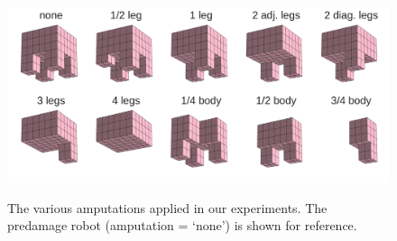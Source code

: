 \begin{figure}[h]
\begin{center}
\includegraphics[trim={14pt 0 14pt 0},clip,width=0.7\linewidth]{Chapter05/fig/damage_scenarios.png}\\
\caption{\label{fig:scenarios}The various amputations applied in our experiments. 
The predamage robot (amputation = `none') is shown for reference.}
\vspace{-13pt}
\end{center}
\end{figure}
